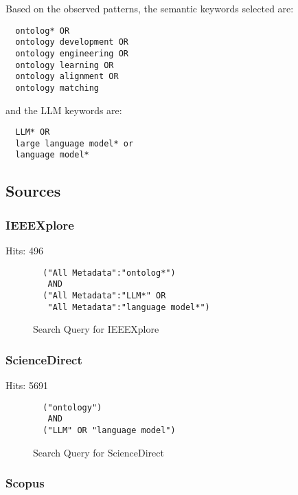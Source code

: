 \documentclass[a4paper,colorinlistoftodos]{article}
\begin{document}
Based on the observed patterns, the semantic keywords selected are:
\begin{lstlisting}
  ontolog* OR
  ontology development OR
  ontology engineering OR
  ontology learning OR
  ontology alignment OR
  ontology matching
\end{lstlisting}

and the LLM keywords are:
\begin{lstlisting}
  LLM* OR
  large language model* or
  language model*
\end{lstlisting}

\subsection{Sources}
\label{subsec:sources}

\subsubsection{IEEEXplore}
\label{subsubsec:ieeexplore}

Hits: 496

\begin{figure}[H]
\begin{lstlisting}
  ("All Metadata":"ontolog*")
   AND
  ("All Metadata":"LLM*" OR
   "All Metadata":"language model*")
\end{lstlisting}
  \label{fig:ieeexplore-query}
  \caption{Search Query for IEEEXplore}
\end{figure}

\subsubsection{ScienceDirect}
\label{subsubsec:sciencedirect}

Hits: 5691 \newline

\begin{figure}[H]
\begin{lstlisting}
  ("ontology")
   AND
  ("LLM" OR "language model")
\end{lstlisting}
  \label{fig:sciencedirect-query}
  \caption{Search Query for ScienceDirect}
\end{figure}

\subsubsection{Scopus}
\label{subsubsec:scopus}
\end{document}
